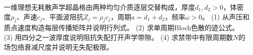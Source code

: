 一维理想无耗散声学超晶格由两种均匀介质逐层交替构成，厚度\(d_1,d_2>0\)，体密度\(\rho_j\)、声速\(c_j\)、平面波阻抗\(Z_j=\rho_jc_j\)，周期\(a=d_1+d_2\)，频率\(\omega>0\)。
(1) 从声压和质点速度构造每层传播矩阵并说明行列式。
(2) 求单周期Bloch色散的迹公式。
(3) 用四分之一波厚度说明阻抗失配打开声学带隙。
(4) 求禁带中有限周期数\(N\)的场包络衰减尺度并说明无失配极限。
